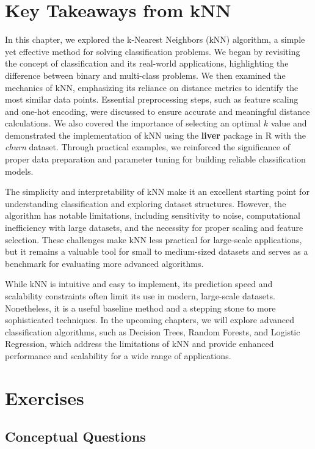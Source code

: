 \documentclass[
]{book}
\theoremstyle{definition}
\theoremstyle{definition}
\theoremstyle{definition}
\theoremstyle{definition}
\theoremstyle{remark}
\begin{document}
\section{Key Takeaways from kNN}\label{key-takeaways-from-knn}

In this chapter, we explored the k-Nearest Neighbors (kNN) algorithm, a simple yet effective method for solving classification problems. We began by revisiting the concept of classification and its real-world applications, highlighting the difference between binary and multi-class problems. We then examined the mechanics of kNN, emphasizing its reliance on distance metrics to identify the most similar data points. Essential preprocessing steps, such as feature scaling and one-hot encoding, were discussed to ensure accurate and meaningful distance calculations. We also covered the importance of selecting an optimal \(k\) value and demonstrated the implementation of kNN using the \textbf{liver} package in R with the \emph{churn} dataset. Through practical examples, we reinforced the significance of proper data preparation and parameter tuning for building reliable classification models.

The simplicity and interpretability of kNN make it an excellent starting point for understanding classification and exploring dataset structures. However, the algorithm has notable limitations, including sensitivity to noise, computational inefficiency with large datasets, and the necessity for proper scaling and feature selection. These challenges make kNN less practical for large-scale applications, but it remains a valuable tool for small to medium-sized datasets and serves as a benchmark for evaluating more advanced algorithms.

While kNN is intuitive and easy to implement, its prediction speed and scalability constraints often limit its use in modern, large-scale datasets. Nonetheless, it is a useful baseline method and a stepping stone to more sophisticated techniques. In the upcoming chapters, we will explore advanced classification algorithms, such as Decision Trees, Random Forests, and Logistic Regression, which address the limitations of kNN and provide enhanced performance and scalability for a wide range of applications.

\section{Exercises}\label{exercises-5}

\subsection*{Conceptual Questions}\label{conceptual-questions-3}
\end{document}

